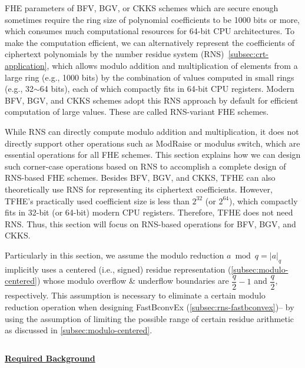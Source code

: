 FHE parameters of BFV, BGV, or CKKS schemes which are secure enough sometimes require the ring size of polynomial coefficients to be 1000 bits or more, which consumes much computational resources for 64-bit CPU architectures. To make the computation efficient, we can alternatively represent the coefficients of ciphertext polynomials by the number residue system (RNS)~\autoref{subsec:crt-application}, which allows modulo addition and multiplication of elements from a large ring (e.g., 1000 bits) by the combination of values computed in small rings (e.g., 32$\sim$64 bits), each of which compactly fits in 64-bit CPU registers. Modern BFV, BGV, and CKKS schemes adopt this RNS approach by default for efficient computation of large values. These are called RNS-variant FHE schemes.  

While RNS can directly compute modulo addition and multiplication, it does not directly support other operations such as \textsf{ModRaise} or modulus switch, which are essential operations for all FHE schemes. This section explains how we can design such corner-case operations based on RNS to accomplish a complete design of RNS-based FHE schemes. Besides BFV, BGV, and CKKS, TFHE can also theoretically use RNS for representing its ciphertext coefficients. However, TFHE's practically used coefficient size is less than $2^{32}$ (or $2^{64}$), which compactly fits in 32-bit (or 64-bit) modern CPU registers. Therefore, TFHE does not need RNS. Thus, this section will focus on RNS-based operations for BFV, BGV, and CKKS. 

Particularly in this section, we assume the modulo reduction $a \bmod q = |a|_q$ implicitly uses a centered (i.e., signed) residue representation (\autoref{subsec:modulo-centered}) whose modulo overflow \& underflow boundaries are $\dfrac{q}{2} - 1$ and $\dfrac{q}{2}$, respectively. This assumption is necessary to eliminate a certain modulo reduction operation when designing \textsf{FastBconvEx} (\autoref{subsec:rns-fastbconvex})-- by using the assumption of limiting the possible range of certain residue arithmetic as discussed in \autoref{subsec:modulo-centered}. 

$ $

\noindent \textbf{\underline{Required Background}}

